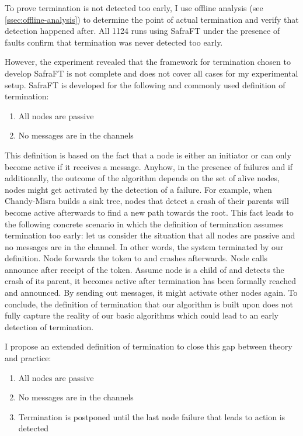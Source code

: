 To prove termination is not detected too early, I use offline analysis (see \cref{ssec:offline-analysis}) to determine the point of actual termination and verify that detection happened after.
All 1124 runs using SafraFT under the presence of faults confirm that termination was never detected too early.

However, the experiment revealed that the framework for termination chosen to develop SafraFT is not complete and does not cover all cases for my experimental setup.
SafraFT is developed for the following and commonly used definition of termination:
\begin{enumerate}
	\item All nodes are passive
	\item No messages are in the channels
\end{enumerate}
This definition is based on the fact that a node is either an initiator or can only become active if it receives a message.
Anyhow, in the presence of failures and if additionally, the outcome of the algorithm depends on the set of alive nodes, nodes might get activated by the detection of a failure.
For example, when Chandy-Misra builds a sink tree, nodes that detect a crash of their parents will become active afterwards to find a new path towards the root.
This fact leads to the following concrete scenario in which the definition of termination assumes termination too early: let us consider the situation that all nodes are passive and no messages are in the channel.
In other words, the system terminated by our definition.
Node  forwards the token to  and crashes afterwards.
Node  calls announce after receipt of the token.
Assume node  is a child of  and detects the crash of its parent, it becomes active after termination has been formally reached and announced.
By sending out  messages, it might activate other nodes again.
To conclude, the definition of termination that our algorithm is built upon does not fully capture the reality of our basic algorithms which could lead to an early detection of termination.

I propose an extended definition of termination to close this gap between theory and practice:
\begin{enumerate}
	\item All nodes are passive
	\item No messages are in the channels
	\item Termination is postponed until the last node failure that leads to action is detected
\end{enumerate}

